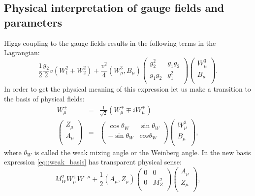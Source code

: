 \subsection{Physical interpretation of gauge fields and parameters}
Higgs coupling to the gauge fields results in the following terms in the Lagrangian:
\begin{equation}
\label{eq::weak_basis}
\frac{1}{2}\frac{g_2}{2}v(W_1^2+W^2_2)+\frac{v^2}{4}(W^3_{\mu},B_{\mu}) \begin{pmatrix}
g_2^2  & g_1 g_2 \\
g_1 g_2 & g_1^2   \\
\end{pmatrix}
\begin{pmatrix}
W^3_{\mu} \\
B_{\mu}   \\
\end{pmatrix}.
\end{equation}
In order to get the physical meaning of this expression let us make a transition to the basis of physical fields:
\begin{equation}
\begin{array}{lcl} 
W^{\pm}_{\mu}  &=& \frac{1}{\sqrt{2}}(W^{\mp}_{\mu}\mp iW^{\mp}_{\mu})\\ 
\begin{pmatrix} Z_{\mu} \\ A_{\mu}   \\ \end{pmatrix}  &=& \begin{pmatrix} \cos{\theta_{W}} & \sin{\theta_{W}}\\ -\sin{\theta_{W}}& cos{\theta_{W}}   \\ \end{pmatrix} \begin{pmatrix} W^3_{\mu} \\ B_{\mu}   \\ \end{pmatrix},
\end{array} 
\end{equation}
where $\theta_{W}$ is called the weak mixing angle or the Weinberg angle. In the new basis expression \ref{eq::weak_basis} has transparent physical sense:
\begin{equation}
M^2_W W^+_{\mu}W^{-\mu} +\frac{1}{2} (A_{\mu},Z_{\mu})\begin{pmatrix}
0 & 0 \\
0 & M^2_Z   \\
\end{pmatrix}
\begin{pmatrix}
A_{\mu} \\
Z_{\mu}   \\
\end{pmatrix},
\end{equation}
